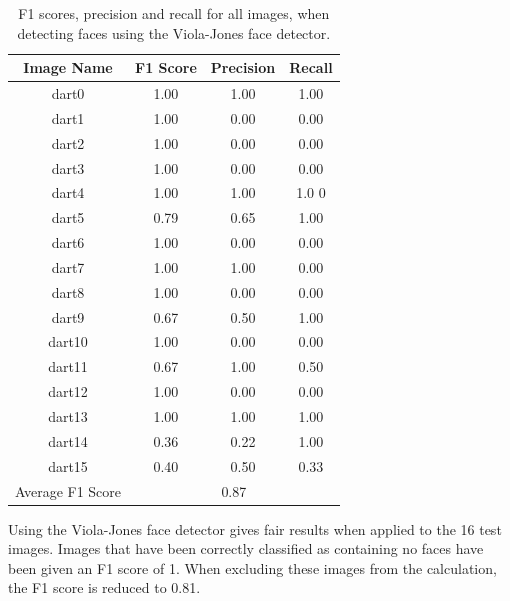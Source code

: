 \documentclass[conference]{IEEEtran}
\begin{document}
\begin{table}[htp]
\caption{F1 scores, precision and recall for all images, when detecting faces using the Viola-Jones face detector.}
\begin{center}
\begin{tabular}{||c|c|c|c||}
\hline
Image Name			 	& F1 Score 	& Precision	& Recall            \\ \hline
dart0						& 1.00		&	1.00		& 1.00		\\
dart1						& 1.00		&	0.00		& 0.00		\\
dart2						& 1.00		&	0.00		& 0.00		\\
dart3						& 1.00		&	0.00		& 0.00		\\
dart4						& 1.00		&	1.00		& 1.0	0		\\
dart5						& 0.79		&	0.65		& 1.00		\\
dart6						& 1.00		&	0.00		& 0.00		\\
dart7						& 1.00		&	1.00		& 0.00		\\
dart8						& 1.00		&	0.00		& 0.00		\\
dart9						& 0.67		&	0.50		& 1.00		\\
dart10					& 1.00		&	0.00		& 0.00		\\
dart11					& 0.67		&	1.00		& 0.50		\\
dart12					& 1.00		&	0.00		& 0.00		\\
dart13					& 1.00		&	1.00		& 1.00		\\
dart14					& 0.36		&	0.22		& 1.00		\\
dart15					& 0.40		&	0.50		& 0.33		\\ \hline
Average F1 Score 		 	&	\multicolumn{3}{c||}{0.87} 			\\ \hline
\end{tabular}
\end{center}
\label{default}
\end{table}
\par
Using the Viola-Jones face detector gives fair results when applied to the 16 test images. Images that have been correctly classified as containing no faces have been given an F1 score of 1. When excluding these images from the calculation, the F1 score is reduced to 0.81.

\newpage
\end{document}
